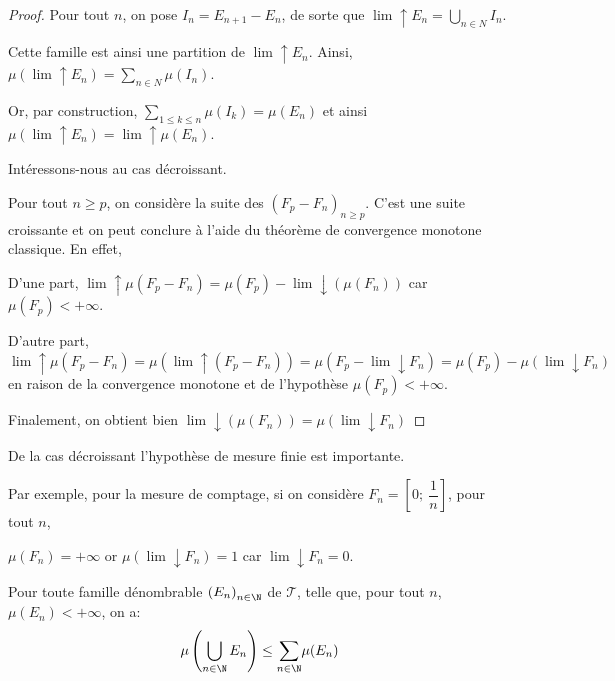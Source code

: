 \begin{proof}
Pour tout $n$, on pose $I_n = E_{n+1}-E_n$, de sorte que $\lim \uparrow E_n = \bigcup \limits_{n \in N} I_n$. 

Cette famille est ainsi une partition de $\lim \uparrow E_n$.
Ainsi, $\mu\left( \lim \uparrow E_n  \right) = \displaystyle{\sum \limits_{n \in N}} \mu(I_n)$. 

Or, par construction, $\displaystyle{\sum \limits_{1 \leq k \leq n}} \mu(I_k) = \mu(E_n)$ et ainsi $\mu\left( \lim \uparrow E_n  \right) = \lim \uparrow \mu(E_n)$.

\medskip
Intéressons-nous au cas décroissant.

Pour tout $n \geq p$, on considère la suite des $\left(F_p-F_n\right)_{n \geq p}$. C'est une suite croissante et on peut conclure à l'aide du théorème de convergence monotone classique. En effet,

D'une part, $\lim \uparrow \mu\left(F_p-F_n\right)=\mu(F_p) - \lim \downarrow \left(\mu(F_n)\right)$ car $\mu(F_p)<+\infty$.

D'autre part, $\lim \uparrow \mu\left(F_p-F_n\right) = \mu\left(\lim \uparrow (F_p-F_n)\right) = \mu\left(F_p-\lim \downarrow F_n\right) = \mu(F_p)-\mu\left( \lim \downarrow F_n \right)$ en raison de la convergence monotone et de l'hypothèse $\mu(F_p)<+\infty$.

Finalement, on obtient bien $\lim \downarrow \left(\mu(F_n)\right) = \mu\left( \lim \downarrow F_n \right)$
\end{proof}

De la cas décroissant l'hypothèse de mesure finie est importante.

Par exemple, pour la mesure de comptage, si on considère $F_n = \left [0;~ \dfrac{1}{n} \right ]$, pour tout $n$, 

$\mu(F_n) =+\infty$ or $\mu\left(\lim \downarrow F_n\right) = 1$ car $\lim \downarrow F_n = {0}$.

\begin{prop}
Pour toute famille dénombrable $\left(E_n\right)_{n \in \N}$ de $\mathcal{T}$, telle que, pour tout $n$, $\mu(E_n)<+\infty$, on a:
\[
\mu\left(\bigcup \limits_{n \in \N} E_n\right) \leq \displaystyle{\sum \limits_{n \in \N}} \mu(E_n)
\]
\end{prop}

